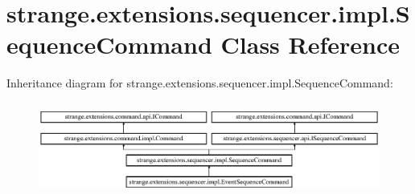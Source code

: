\hypertarget{classstrange_1_1extensions_1_1sequencer_1_1impl_1_1_sequence_command}{\section{strange.\-extensions.\-sequencer.\-impl.\-Sequence\-Command Class Reference}
\label{classstrange_1_1extensions_1_1sequencer_1_1impl_1_1_sequence_command}
}
Inheritance diagram for strange.\-extensions.\-sequencer.\-impl.\-Sequence\-Command\-:\begin{figure}[H]
\begin{center}
\leavevmode
\includegraphics[height=3.102493cm]{classstrange_1_1extensions_1_1sequencer_1_1impl_1_1_sequence_command}
\end{center}
\end{figure}
